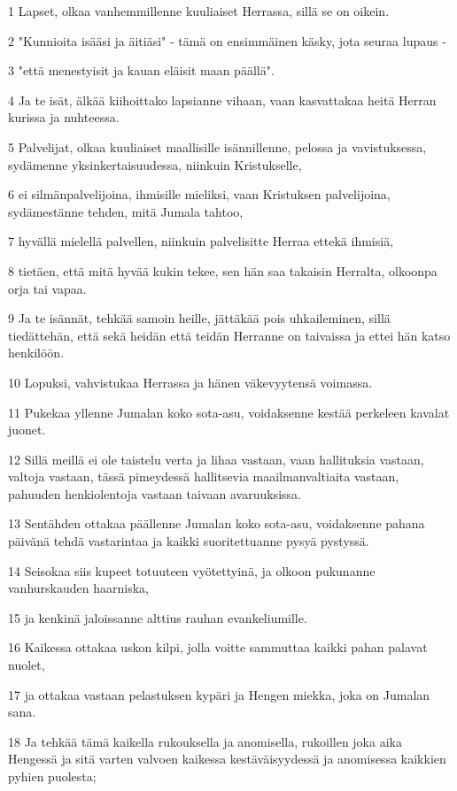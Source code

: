 \par 1 Lapset, olkaa vanhemmillenne kuuliaiset Herrassa, sillä se on oikein.
\par 2 "Kunnioita isääsi ja äitiäsi" - tämä on ensimmäinen käsky, jota seuraa lupaus -
\par 3 "että menestyisit ja kauan eläisit maan päällä".
\par 4 Ja te isät, älkää kiihoittako lapsianne vihaan, vaan kasvattakaa heitä Herran kurissa ja nuhteessa.
\par 5 Palvelijat, olkaa kuuliaiset maallisille isännillenne, pelossa ja vavistuksessa, sydämenne yksinkertaisuudessa, niinkuin Kristukselle,
\par 6 ei silmänpalvelijoina, ihmisille mieliksi, vaan Kristuksen palvelijoina, sydämestänne tehden, mitä Jumala tahtoo,
\par 7 hyvällä mielellä palvellen, niinkuin palvelisitte Herraa ettekä ihmisiä,
\par 8 tietäen, että mitä hyvää kukin tekee, sen hän saa takaisin Herralta, olkoonpa orja tai vapaa.
\par 9 Ja te isännät, tehkää samoin heille, jättäkää pois uhkaileminen, sillä tiedättehän, että sekä heidän että teidän Herranne on taivaissa ja ettei hän katso henkilöön.
\par 10 Lopuksi, vahvistukaa Herrassa ja hänen väkevyytensä voimassa.
\par 11 Pukekaa yllenne Jumalan koko sota-asu, voidaksenne kestää perkeleen kavalat juonet.
\par 12 Sillä meillä ei ole taistelu verta ja lihaa vastaan, vaan hallituksia vastaan, valtoja vastaan, tässä pimeydessä hallitsevia maailmanvaltiaita vastaan, pahuuden henkiolentoja vastaan taivaan avaruuksissa.
\par 13 Sentähden ottakaa päällenne Jumalan koko sota-asu, voidaksenne pahana päivänä tehdä vastarintaa ja kaikki suoritettuanne pysyä pystyssä.
\par 14 Seisokaa siis kupeet totuuteen vyötettyinä, ja olkoon pukunanne vanhurskauden haarniska,
\par 15 ja kenkinä jaloissanne alttius rauhan evankeliumille.
\par 16 Kaikessa ottakaa uskon kilpi, jolla voitte sammuttaa kaikki pahan palavat nuolet,
\par 17 ja ottakaa vastaan pelastuksen kypäri ja Hengen miekka, joka on Jumalan sana.
\par 18 Ja tehkää tämä kaikella rukouksella ja anomisella, rukoillen joka aika Hengessä ja sitä varten valvoen kaikessa kestäväisyydessä ja anomisessa kaikkien pyhien puolesta;
